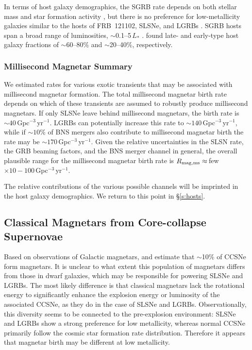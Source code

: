 \documentclass[twocolumn]{aastex6}
\newcommand{\apx}{\ensuremath{\sim}}
\newcommand{\repeater}{FRB~121102}
\begin{document}
In terms of host galaxy demographics, the SGRB rate depends on both stellar mass and star formation activity \citep{lei2010}, but there is no preference for low-metallicity galaxies similar to the hosts of \repeater, SLSNe, and LGRBs \citep{ber2009,fong.2013,ber2014}. SGRB hosts span a broad range of luminosities, \apx0.1--5\,$L_*$ \citep{ber2014}. \citet{fong.2013} found late- and early-type host galaxy fractions of \apx60--80\% and \apx20--40\%, respectively.  


\subsubsection{Millisecond Magnetar Summary}
\label{s:sum}

We estimated rates for various exotic transients that may be associated with millisecond magnetar formation. The total millisecond magnetar birth rate depends on which of these transients are assumed to robustly produce millisecond magnetars. If only SLSNe leave behind millisecond magnetars, the birth rate is $\sim 40$\,Gpc$^{-3}$\,yr$^{-1}$. LGRBs can potentially increase this rate to $\sim 140$\,Gpc$^{-3}$\,yr$^{-1}$, while if $\sim 10$\% of BNS mergers also contribute to millisecond magnetar birth the rate may be $\sim 170$\,Gpc$^{-3}$\,yr$^{-1}$.  Given the relative uncertainties in the SLSN rate, the GRB beaming factors, and the BNS merger channel in general, the overall plausible range for the millisecond magnetar birth rate is $R_{\rm mag,ms} \approx$\,few\,$\times 10-100$\,Gpc$^{-3}$\,yr$^{-1}$. 

The relative contributions of the various possible channels will be imprinted in the host galaxy demographics.  We return to this point in \S\ref{s:hosts}.

\subsection{Classical Magnetars from Core-collapse Supernovae}
\label{s:ccsne}

Based on observations of Galactic magnetars, \citet{kou1998} and \citet{gill2007} estimate that \apx10\% of CCSNe form magnetars. It is unclear to what extent this population of magnetars differs from those in dwarf galaxies, which may be responsible for powering SLSNe and LGRBs. The most likely difference is that classical magnetars lack the rotational energy to significantly enhance the explosion energy or luminosity of the associated CCSNe, as they do in the case of SLSNe and LGRBs.  Observationally, this diversity seems to be connected to the pre-explosion environment: SLSNe and LGRBs show a strong preference for low metallicity, whereas normal CCSNe primarily follow the cosmic star formation rate distribution. Therefore it appears that magnetar birth may be different at low metallicity.
\end{document}
